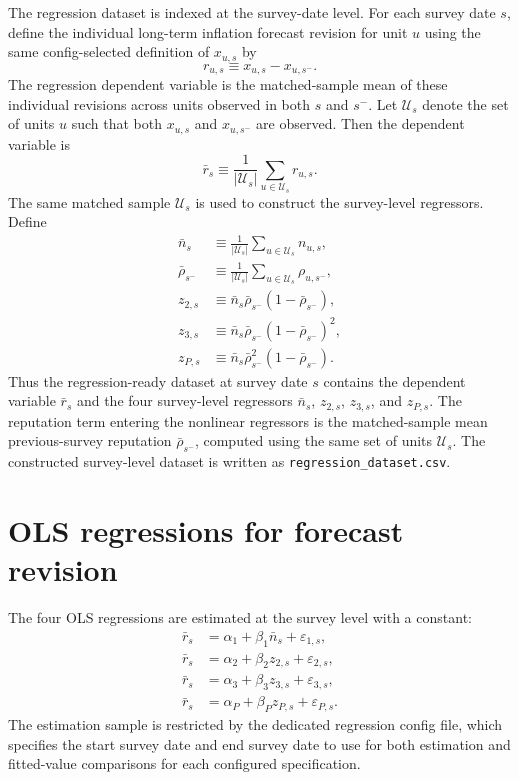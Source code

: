 \documentclass[11pt]{article}
\begin{document}
The regression dataset is indexed at the survey-date level. For each survey
date $s$, define the individual long-term inflation forecast revision for unit
$u$ using the same config-selected definition of $x_{u,s}$ by
\begin{equation}
r_{u,s} \equiv x_{u,s} - x_{u,s^{-}}.
\end{equation}
The regression dependent variable is the matched-sample mean of these
individual revisions across units observed in both $s$ and $s^{-}$. Let
$\mathcal{U}_s$ denote the set of units $u$ such that both $x_{u,s}$ and
$x_{u,s^{-}}$ are observed. Then the dependent variable is
\begin{equation}
\bar{r}_s \equiv \frac{1}{|\mathcal{U}_s|}\sum_{u \in \mathcal{U}_s} r_{u,s}.
\end{equation}
The same matched sample $\mathcal{U}_s$ is used to construct the survey-level
regressors. Define
\begin{align}
\bar{n}_s &\equiv \frac{1}{|\mathcal{U}_s|}\sum_{u \in \mathcal{U}_s} n_{u,s}, \\
\bar{\rho}_{s^{-}} &\equiv \frac{1}{|\mathcal{U}_s|}\sum_{u \in \mathcal{U}_s} \rho_{u,s^{-}}, \\
z_{2,s} &\equiv \bar{n}_s \bar{\rho}_{s^{-}}\left(1-\bar{\rho}_{s^{-}}\right), \\
z_{3,s} &\equiv \bar{n}_s \bar{\rho}_{s^{-}}\left(1-\bar{\rho}_{s^{-}}\right)^2, \\
z_{P,s} &\equiv \bar{n}_s \bar{\rho}_{s^{-}}^2\left(1-\bar{\rho}_{s^{-}}\right).
\end{align}
Thus the regression-ready dataset at survey date $s$ contains the dependent
variable $\bar{r}_s$ and the four survey-level regressors
$\bar{n}_s$, $z_{2,s}$, $z_{3,s}$, and $z_{P,s}$. The reputation term entering the
nonlinear regressors is the matched-sample mean previous-survey reputation
$\bar{\rho}_{s^{-}}$, computed using the same set of units $\mathcal{U}_s$.
The constructed survey-level dataset is written as
\texttt{regression\_dataset.csv}.

\section{OLS regressions for forecast revision}

The four OLS regressions are estimated at the survey level with a constant:
\begin{align}
\bar{r}_s &= \alpha_1 + \beta_1 \bar{n}_s + \varepsilon_{1,s}, \\
\bar{r}_s &= \alpha_2 + \beta_2 z_{2,s} + \varepsilon_{2,s}, \\
\bar{r}_s &= \alpha_3 + \beta_3 z_{3,s} + \varepsilon_{3,s}, \\
\bar{r}_s &= \alpha_P + \beta_P z_{P,s} + \varepsilon_{P,s}.
\end{align}
The estimation sample is restricted by the dedicated regression config file,
which specifies the start survey date and end survey date to use for both
estimation and fitted-value comparisons for each configured specification.
\end{document}
